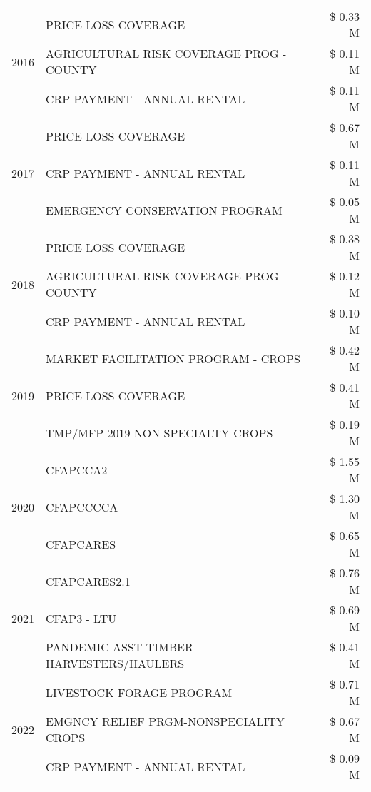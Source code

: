\begin{tabular}{llr}
\cline{1-3}
\multirow[t]{3}{*}{2016} & PRICE LOSS COVERAGE & \$ 0.33 M \\
 & AGRICULTURAL RISK COVERAGE PROG - COUNTY & \$ 0.11 M \\
 & CRP PAYMENT - ANNUAL RENTAL & \$ 0.11 M \\
\cline{1-3}
\multirow[t]{3}{*}{2017} & PRICE LOSS COVERAGE & \$ 0.67 M \\
 & CRP PAYMENT - ANNUAL RENTAL & \$ 0.11 M \\
 & EMERGENCY CONSERVATION PROGRAM & \$ 0.05 M \\
\cline{1-3}
\multirow[t]{3}{*}{2018} & PRICE LOSS COVERAGE & \$ 0.38 M \\
 & AGRICULTURAL RISK COVERAGE PROG - COUNTY & \$ 0.12 M \\
 & CRP PAYMENT - ANNUAL RENTAL & \$ 0.10 M \\
\cline{1-3}
\multirow[t]{3}{*}{2019} & MARKET FACILITATION PROGRAM - CROPS & \$ 0.42 M \\
 & PRICE LOSS COVERAGE & \$ 0.41 M \\
 & TMP/MFP 2019 NON SPECIALTY CROPS & \$ 0.19 M \\
\cline{1-3}
\multirow[t]{3}{*}{2020} & CFAPCCA2 & \$ 1.55 M \\
 & CFAPCCCCA & \$ 1.30 M \\
 & CFAPCARES & \$ 0.65 M \\
\cline{1-3}
\multirow[t]{3}{*}{2021} & CFAPCARES2.1 & \$ 0.76 M \\
 & CFAP3 - LTU & \$ 0.69 M \\
 & PANDEMIC ASST-TIMBER HARVESTERS/HAULERS & \$ 0.41 M \\
\cline{1-3}
\multirow[t]{3}{*}{2022} & LIVESTOCK FORAGE PROGRAM & \$ 0.71 M \\
 & EMGNCY RELIEF PRGM-NONSPECIALITY CROPS & \$ 0.67 M \\
 & CRP PAYMENT - ANNUAL RENTAL & \$ 0.09 M \\
\cline{1-3}
\bottomrule
\end{tabular}

